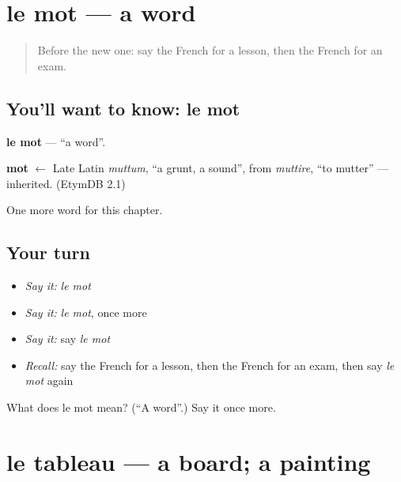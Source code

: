 \section[le mot]{le mot — a word}

\label{lesson:FR-C126-mot}



\begin{quote}
Before the new one: say the French for a lesson, then the French for an exam.
\end{quote}

\subsection*{You'll want to know: le mot}
\textbf{le mot} — \textquotedblleft{}a word\textquotedblright{}.

\begin{cousinweb}
\textbf{mot} $\leftarrow$ Late Latin \emph{muttum}, \textquotedblleft{}a grunt, a sound\textquotedblright{}, from \emph{muttire}, \textquotedblleft{}to mutter\textquotedblright{} — inherited. (EtymDB 2.1)
\end{cousinweb}

\begin{grammarlens}[title={What you've built}]
One more word for this chapter.
\end{grammarlens}

\subsection*{Your turn}
\begin{itemize}
\raggedright
  \item \emph{Say it:} \emph{le mot}
  \item \emph{Say it:} \emph{le mot}, once more
  \item \emph{Say it:} say \emph{le mot}
  \item \emph{Recall:} say the French for a lesson, then the French for an exam, then say \emph{le mot} again
\end{itemize}

\begin{tcolorbox}[breakable,colback=teal!4,colframe=teal!35!black,title={Before you move on}]
What does le mot mean? (\textquotedblleft{}A word\textquotedblright{}.) Say it once more.
\end{tcolorbox}
\section[le tableau]{le tableau — a board; a painting}

